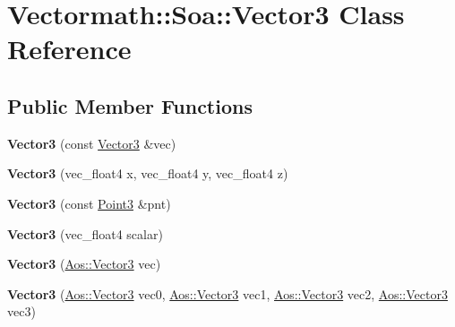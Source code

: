 \hypertarget{classVectormath_1_1Soa_1_1Vector3}{\section{Vectormath\-:\-:Soa\-:\-:Vector3 Class Reference}
\label{classVectormath_1_1Soa_1_1Vector3}
}
\subsection*{Public Member Functions}
\begin{DoxyCompactItemize}
\item 
\hypertarget{classVectormath_1_1Soa_1_1Vector3_adae211af29e368313024b74f9db3df91}{{\bfseries Vector3} (const \hyperlink{classVectormath_1_1Soa_1_1Vector3}{Vector3} \&vec)}\label{classVectormath_1_1Soa_1_1Vector3_adae211af29e368313024b74f9db3df91}

\item 
\hypertarget{classVectormath_1_1Soa_1_1Vector3_a9b6c2c9ca162b4a67a126a6f39a2fcf3}{{\bfseries Vector3} (vec\-\_\-float4 x, vec\-\_\-float4 y, vec\-\_\-float4 z)}\label{classVectormath_1_1Soa_1_1Vector3_a9b6c2c9ca162b4a67a126a6f39a2fcf3}

\item 
\hypertarget{classVectormath_1_1Soa_1_1Vector3_adfa1eab885896c70eef4cc43d2b70976}{{\bfseries Vector3} (const \hyperlink{classVectormath_1_1Soa_1_1Point3}{Point3} \&pnt)}\label{classVectormath_1_1Soa_1_1Vector3_adfa1eab885896c70eef4cc43d2b70976}

\item 
\hypertarget{classVectormath_1_1Soa_1_1Vector3_a007123be368a50e520e8201e53b5f028}{{\bfseries Vector3} (vec\-\_\-float4 scalar)}\label{classVectormath_1_1Soa_1_1Vector3_a007123be368a50e520e8201e53b5f028}

\item 
\hypertarget{classVectormath_1_1Soa_1_1Vector3_a4bed8595f3c35e6cc85434308b6e7a11}{{\bfseries Vector3} (\hyperlink{classVectormath_1_1Aos_1_1Vector3}{Aos\-::\-Vector3} vec)}\label{classVectormath_1_1Soa_1_1Vector3_a4bed8595f3c35e6cc85434308b6e7a11}

\item 
\hypertarget{classVectormath_1_1Soa_1_1Vector3_a8745c2b774b896367f1344c002926a17}{{\bfseries Vector3} (\hyperlink{classVectormath_1_1Aos_1_1Vector3}{Aos\-::\-Vector3} vec0, \hyperlink{classVectormath_1_1Aos_1_1Vector3}{Aos\-::\-Vector3} vec1, \hyperlink{classVectormath_1_1Aos_1_1Vector3}{Aos\-::\-Vector3} vec2, \hyperlink{classVectormath_1_1Aos_1_1Vector3}{Aos\-::\-Vector3} vec3)}\label{classVectormath_1_1Soa_1_1Vector3_a8745c2b774b896367f1344c002926a17}


\end{DoxyCompactItemize}
